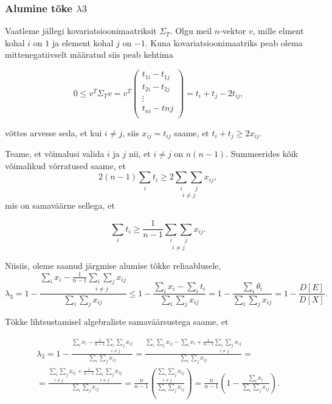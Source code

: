 \documentclass[a4paper,12pt]{article}
\numberwithin{equation}{section}
\theoremstyle{definition}
\begin{document}
\subsubsection{Alumine tõke $\lambda3$}

Vaatleme jällegi kovariatsioonimaatriksit $\Sigma_T$. Olgu meil $n$-vektor $v$, mille elment kohal $i$ on $1$ ja element kohal $j$ on $-1$. Kuna kovariatsioonimaatriks peab olema mittenegatiivselt määratud siis peab kehtima

\begin{equation*}
\label{eq:psd 1 -1 vector}
0 \leq v^T \Sigma_T v = v^T 
\begin{pmatrix}
t_{1i} - t_{1j} \\
t_{2i} - t_{2j} \\
\vdots \\
t_{ni} - t{nj} \\
\end{pmatrix}
= t_{i} + t_{j} - 2 t_{ij} \text{,}
\end{equation*}

võttes arvesse seda, et kui $i \neq j$, siis $x_{ij} = t_{ij}$ saame, et $t_i + t_j \geq 2 x_{ij}$. 

Teame, et võimalusi valida $i$ ja $j$ nii, et $i \neq j$ on $n \left( n -1 \right)$. Summeerides kõik võimalikud võrratused saame, et
\begin{equation*}
2 \left( n - 1 \right) \sum_i t_i \geq 2  \underset{i \neq j}{\sum_i \sum_j} x_{ij},
\end{equation*}
mis on samaväärne sellega, et

\begin{equation*}
\sum_i t_i \geq  \frac{1}{n - 1} \underset{i \neq j}{\sum_i \sum_j} x_{ij}.
\end{equation*}


Niisiis, oleme saanud järgmise alumise tõkke reliaablusele, 
\begin{equation*}
\lambda_3 = 1 - \frac{\sum_i x_i - \frac{1}{n-1}{\underset{i \neq j}{\sum_i \sum_j} x_{ij}}}{\sum_i \sum_j x_{ij}} \leq  1 - \frac{\sum_i x_i - \sum_i t_i}{\sum_i \sum_j x_{ij}} =   1 - \frac{\sum_i \theta_i}{\sum_i \sum_j x_{ij}} =  1 - \frac{D \left[ E \right]}{D \left[ X \right]} \text{.}
\end{equation*}

Tõkke lihtsustamisel algebraliste samaväärsustega saame, et

\begin{equation*}
\begin{gathered}
\lambda_3 = 1 - \frac{\sum_i x_i - \frac{1}{n-1}{\underset{i \neq j}{\sum_i \sum_j} x_{ij}}}{\sum_i \sum_j x_{ij}} =  \frac{\sum_i \sum_j x_{ij} -  \sum_i x_i + \frac{1}{n-1}{\underset{i \neq j}{\sum_i \sum_j} x_{ij}}  }{\sum_i \sum_j x_{ij}} = \\
= \frac{{\underset{i \neq j}{\sum_i \sum_j} x_{ij}} + \frac{1}{n-1}{\underset{i \neq j}{\sum_i \sum_j} x_{ij}}}{\sum_i \sum_j x_{ij}} = \frac{n}{n-1} \left( \frac{\underset{i \neq j}{\sum_i \sum_j} x_{ij}}{\sum_i \sum_j x_{ij}} \right) = \frac{n}{n-1} \left(1 - \frac{\sum_i x_{i}}{\sum_i \sum_j x_{ij}} \right).
\end{gathered}
\end{equation*}
\end{document}

